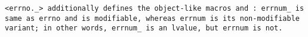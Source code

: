 \tt{<errno._>} additionally defines the object-like macros 
and : \tt{errnum_} is same as \tt{errno} and is modifiable,
whereas \tt{errnum} is its non-modifiable variant;
in other words, \tt{errnum_} is an lvalue, but \tt{errnum} is not.
